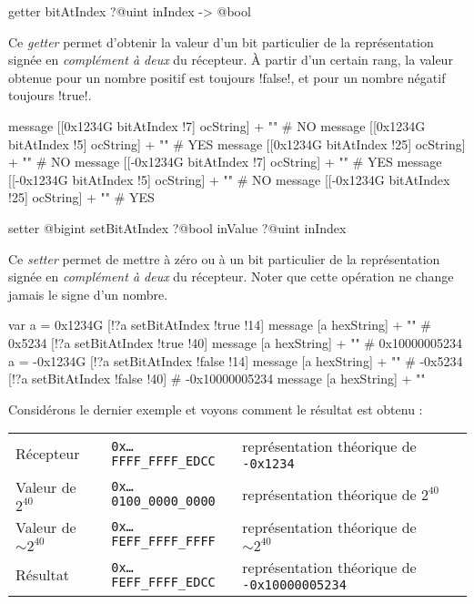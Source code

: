 \begin{galgas3box}
getter bitAtIndex ?@uint inIndex -> @bool
\end{galgas3box}

Ce \emph{getter} permet d'obtenir la valeur d'un bit particulier de la représentation signée en \emph{complément à deux} du récepteur. À partir d'un certain rang, la valeur obtenue pour un nombre positif est toujours \ggst!false!, et pour un nombre négatif toujours \ggst!true!.

\begin{galgas3}
message [[0x1234G bitAtIndex !7] ocString] + "\n" # NO
message [[0x1234G bitAtIndex !5] ocString] + "\n" # YES
message [[0x1234G bitAtIndex !25] ocString] + "\n" # NO
message [[-0x1234G bitAtIndex !7] ocString] + "\n" # YES
message [[-0x1234G bitAtIndex !5] ocString] + "\n" # NO
message [[-0x1234G bitAtIndex !25] ocString] + "\n" # YES
\end{galgas3}


\begin{galgas3box}
setter @bigint setBitAtIndex ?@bool inValue ?@uint inIndex
\end{galgas3box}

Ce \emph{setter} permet de mettre à zéro ou à un bit particulier de la représentation signée en \emph{complément à deux} du récepteur. Noter que cette opération ne change jamais le signe d'un nombre.

\begin{galgas3}
var a = 0x1234G
[!?a setBitAtIndex !true !14]
message [a hexString] + "\n" # 0x5234
[!?a setBitAtIndex !true !40]
message [a hexString] + "\n" # 0x10000005234
a = -0x1234G
[!?a setBitAtIndex !false !14]
message [a hexString] + "\n" # -0x5234
[!?a setBitAtIndex !false !40] # -0x10000005234
message [a hexString] + "\n"
\end{galgas3}

Considérons le dernier exemple et voyons comment le résultat est obtenu :

\begin{tabular}{llll}
Récepteur & \texttt{0x…FFFF\_FFFF\_EDCC} & représentation théorique de \texttt{-0x1234}\\
Valeur de $2^{40}$ & \texttt{0x…0100\_0000\_0000} & représentation théorique de $2^{40}$ \\
Valeur de $\sim2^{40}$ & \texttt{0x…FEFF\_FFFF\_FFFF} & représentation théorique de $\sim2^{40}$ \\
Résultat & \texttt{0x…FEFF\_FFFF\_EDCC} & représentation théorique de \texttt{-0x10000005234} \\
\end{tabular}

